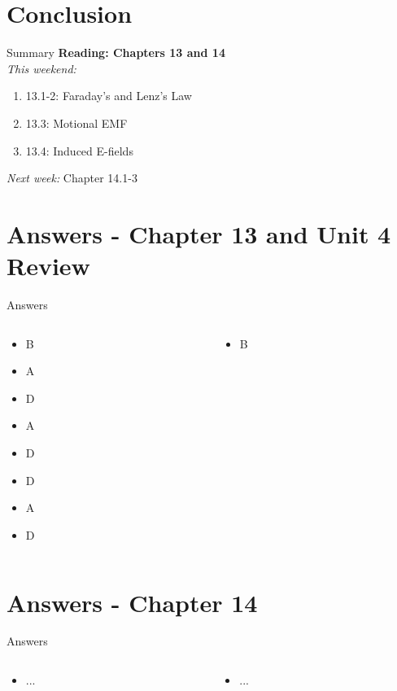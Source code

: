 \documentclass{beamer}
\begin{document}
\section{Conclusion}

\begin{frame}{Summary}
\textbf{Reading: Chapters 13 and 14} \\ \vspace{0.5cm}
\textit{This weekend:}
\begin{enumerate}
\item 13.1-2: Faraday's and Lenz's Law
\item 13.3: Motional EMF
\item 13.4: Induced E-fields
\end{enumerate}
\textit{Next week:} Chapter 14.1-3
\end{frame}

\section{Answers - Chapter 13 and Unit 4 Review}

\begin{frame}{Answers}
\small
\begin{columns}[T]
\begin{column}{0.5\textwidth}
\begin{itemize}
\item B
\item A
\item D
\item A
\item D
\item D
\item A
\item D
\end{itemize}
\end{column}
\begin{column}{0.5\textwidth}
\begin{itemize}
\item B
\end{itemize}
\end{column}
\end{columns}
\end{frame}

\section{Answers - Chapter 14}

\begin{frame}{Answers}
\small
\begin{columns}[T]
\begin{column}{0.5\textwidth}
\begin{itemize}
\item ...
\end{itemize}
\end{column}
\begin{column}{0.5\textwidth}
\begin{itemize}
\item ...
\end{itemize}
\end{column}
\end{columns}
\end{frame}
\end{document}
